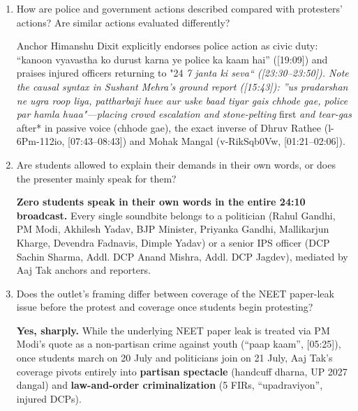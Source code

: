 \documentclass[10pt,a4paper]{article}
\begin{document}
{\begin{enumerate}[leftmargin=1.5em, itemsep=6pt, topsep=4pt]
  Claims of \textbf{police/plainclothes brutality against students} (stitched heads, broken limbs, Hitler-style ``praivet dres'' lathi gangs, torn girls' clothes) appear \textbf{only inside opposition politicians' soundbites} (Rahul Gandhi [04:47], Akhilesh Yadav [06:19--07:08], Kharge [08:38--08:59], [09:56])---with \textbf{zero injured students interviewed directly by Aaj Tak}!
  \item How are police and government actions described compared with protesters' actions? Are similar actions evaluated differently?\par\smallskip
  Anchor Himanshu Dixit explicitly endorses police action as civic duty: ``kanoon vyavastha ko durust karna ye police ka kaam hai'' ([19:09]) and praises injured officers returning to "24 \emph{ 7 janta ki seva`` ([23:30--23:50]). Note the causal syntax in Sushant Mehra's ground report ([15:43]): ''us pradarshan ne ugra roop liya, pattharbaji huee aur uske baad tiyar gais chhode gae, police par hamla huaa"---placing crowd escalation and stone-pelting }first\emph{ and tear-gas }after* in passive voice (chhode gae), the exact inverse of Dhruv Rathee (l-6Pm-112io, [07:43--08:43]) and Mohak Mangal (v-RikSqb0Vw, [01:21--02:06]).
  \item Are students allowed to explain their demands in their own words, or does the presenter mainly speak for them?\par\smallskip
  \textbf{Zero students speak in their own words in the entire 24:10 broadcast.} Every single soundbite belongs to a politician (Rahul Gandhi, PM Modi, Akhilesh Yadav, BJP Minister, Priyanka Gandhi, Mallikarjun Kharge, Devendra Fadnavis, Dimple Yadav) or a senior IPS officer (DCP Sachin Sharma, Addl. DCP Anand Mishra, Addl. DCP Jagdev), mediated by Aaj Tak anchors and reporters.
  \item Does the outlet's framing differ between coverage of the NEET paper-leak issue before the protest and coverage once students begin protesting?\par\smallskip
  \textbf{Yes, sharply.} While the underlying NEET paper leak is treated via PM Modi's quote as a non-partisan crime against youth (``paap kaam'', [05:25]), once students march on 20 July and politicians join on 21 July, Aaj Tak's coverage pivots entirely into \textbf{partisan spectacle} (handcuff dharna, UP 2027 dangal) and \textbf{law-and-order criminalization} (5 FIRs, ``upadraviyon'', injured DCPs).
\end{enumerate}
}
\end{document}
